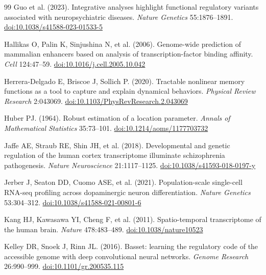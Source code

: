 \begin{thebibliography}{99}
 Guo et al. (2023). Integrative analyses highlight functional regulatory variants associated with neuropsychiatric diseases. \textit{Nature Genetics} 55:1876–1891. \href{https://doi.org/10.1038/s41588-023-01533-5}{doi:10.1038/s41588-023-01533-5}

 Hallikas O, Palin K, Sinjushina N, et al. (2006). Genome-wide prediction of mammalian enhancers based on analysis of transcription-factor binding affinity. \textit{Cell} 124:47–59. \href{https://doi.org/10.1016/j.cell.2005.10.042}{doi:10.1016/j.cell.2005.10.042}

 Herrera-Delgado E, Briscoe J, Sollich P. (2020). Tractable nonlinear memory functions as a tool to capture and explain dynamical behaviors. \textit{Physical Review Research} 2:043069. \href{https://doi.org/10.1103/PhysRevResearch.2.043069}{doi:10.1103/PhysRevResearch.2.043069}

 Huber PJ. (1964). Robust estimation of a location parameter. \textit{Annals of Mathematical Statistics} 35:73–101. \href{https://doi.org/10.1214/aoms/1177703732}{doi:10.1214/aoms/1177703732}

 Jaffe AE, Straub RE, Shin JH, et al. (2018). Developmental and genetic regulation of the human cortex transcriptome illuminate schizophrenia pathogenesis. \textit{Nature Neuroscience} 21:1117–1125. \href{https://doi.org/10.1038/s41593-018-0197-y}{doi:10.1038/s41593-018-0197-y}

 Jerber J, Seaton DD, Cuomo ASE, et al. (2021). Population-scale single-cell RNA-seq profiling across dopaminergic neuron differentiation. \textit{Nature Genetics} 53:304–312. \href{https://doi.org/10.1038/s41588-021-00801-6}{doi:10.1038/s41588-021-00801-6}

 Kang HJ, Kawasawa YI, Cheng F, et al. (2011). Spatio-temporal transcriptome of the human brain. \textit{Nature} 478:483–489. \href{https://doi.org/10.1038/nature10523}{doi:10.1038/nature10523}

 Kelley DR, Snoek J, Rinn JL. (2016). Basset: learning the regulatory code of the accessible genome with deep convolutional neural networks. \textit{Genome Research} 26:990–999. \href{https://doi.org/10.1101/gr.200535.115}{doi:10.1101/gr.200535.115}


\end{thebibliography}
